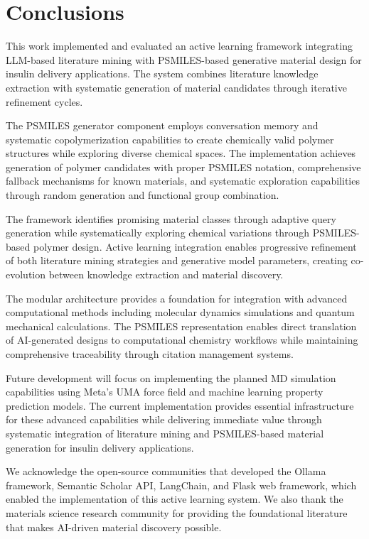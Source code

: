 \documentclass[%
 reprint,
 amsmath,amssymb,
 aps,
]{revtex4-2}
\begin{document}
\section{Conclusions}

This work implemented and evaluated an active learning framework integrating LLM-based literature mining with PSMILES-based generative material design for insulin delivery applications. The system combines literature knowledge extraction with systematic generation of material candidates through iterative refinement cycles.

The PSMILES generator component employs conversation memory and systematic copolymerization capabilities to create chemically valid polymer structures while exploring diverse chemical spaces. The implementation achieves generation of polymer candidates with proper PSMILES notation, comprehensive fallback mechanisms for known materials, and systematic exploration capabilities through random generation and functional group combination.

The framework identifies promising material classes through adaptive query generation while systematically exploring chemical variations through PSMILES-based polymer design. Active learning integration enables progressive refinement of both literature mining strategies and generative model parameters, creating co-evolution between knowledge extraction and material discovery.

The modular architecture provides a foundation for integration with advanced computational methods including molecular dynamics simulations and quantum mechanical calculations. The PSMILES representation enables direct translation of AI-generated designs to computational chemistry workflows while maintaining comprehensive traceability through citation management systems.

Future development will focus on implementing the planned MD simulation capabilities using Meta's UMA force field and machine learning property prediction models. The current implementation provides essential infrastructure for these advanced capabilities while delivering immediate value through systematic integration of literature mining and PSMILES-based material generation for insulin delivery applications.

\begin{acknowledgments}
We acknowledge the open-source communities that developed the Ollama framework, Semantic Scholar API, LangChain, and Flask web framework, which enabled the implementation of this active learning system. We also thank the materials science research community for providing the foundational literature that makes AI-driven material discovery possible.
\end{acknowledgments}
\end{document}

